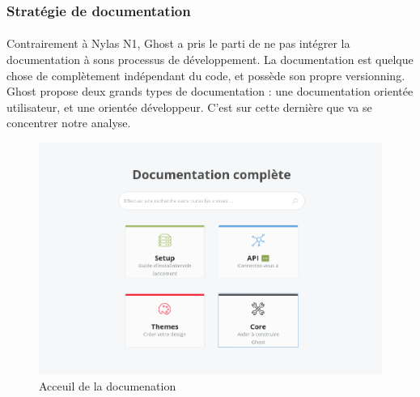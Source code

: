     \subsubsection{Stratégie de documentation}
        \paragraph{}
            Contrairement à Nylas N1, Ghost a pris le parti de ne pas intégrer la documentation à sons processus
            de développement. La documentation est quelque chose de complètement indépendant du code,
            et possède son propre versionning. Ghost propose deux grands types de documentation : une documentation
            orientée utilisateur, et une orientée développeur. C'est sur cette dernière que va se concentrer
            notre analyse.

        \begin{figure}[h]
            \centering
            \includegraphics[scale=0.35]{./assets/ghost1.png}
            \caption{Acceuil de la documenation}
        \end{figure}

